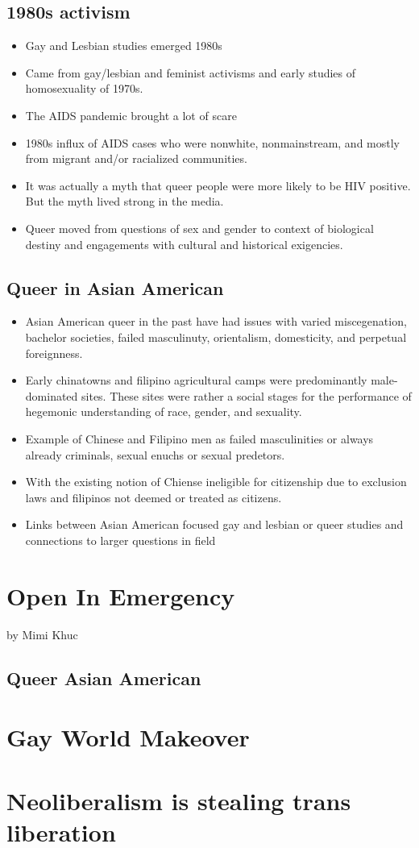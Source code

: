 \documentclass{article}
\begin{document}
  \subsection{1980s activism}
  \begin{itemize}
    \item Gay and Lesbian studies emerged 1980s
    \item Came from gay/lesbian and feminist activisms and
      early studies of homosexuality of 1970s.
    \item The AIDS pandemic brought a lot of scare
    \item 1980s influx of AIDS cases who were nonwhite,
      nonmainstream, and mostly from migrant and/or racialized communities.
    \item It was actually a myth that queer people
      were more likely to be HIV positive.
      But the myth lived strong in the media.
    \item Queer moved from questions of sex and gender
      to context of biological destiny and engagements
      with cultural and historical exigencies.
  \end{itemize}

  \subsection{Queer in Asian American}
  \begin{itemize}
    \item Asian American queer in the past have had issues
      with varied miscegenation, bachelor societies,
      failed masculinuty, orientalism, domesticity,
      and perpetual foreignness.
    \item Early chinatowns and filipino agricultural camps were
      predominantly male-dominated sites. These sites were
      rather a social stages for the performance of hegemonic
      understanding of race, gender, and sexuality.
    \item Example of Chinese and Filipino men as failed masculinities
      or always already criminals, sexual enuchs or sexual predetors.
    \item With the existing notion of Chiense
      ineligible for citizenship due to exclusion laws and filipinos not
      deemed or treated as citizens.
    \item Links between Asian American focused gay and lesbian or queer studies
      and connections to larger questions in field
  \end{itemize}



  \section{Open In Emergency}
  by Mimi Khuc


  \subsection{Queer Asian American}


  \section{Gay World Makeover}
  \section{Neoliberalism is stealing trans liberation}
\end{document}
